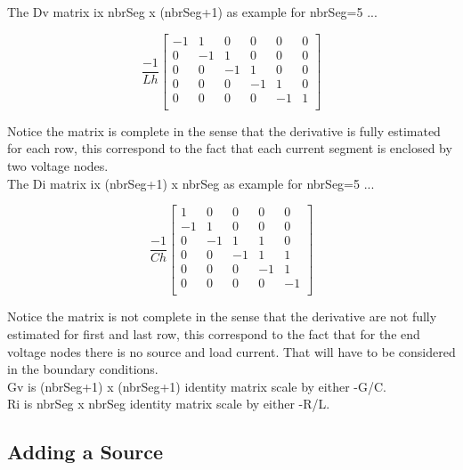 \documentclass[12pt, letterpaper]{article}
\begin{document}
The Dv matrix ix nbrSeg x (nbrSeg+1) as example for nbrSeg=5 ...

\begin{equation}
	\frac{-1}{L h}
	\begin{bmatrix}
	   -1 &  1 & 0 & 0 & 0 &0 \\
	    0 & -1 & 1 & 0 & 0 &0 \\
	    0 &  0 & -1 & 1 & 0 &0 \\
	    0 &  0 & 0 & -1 & 1 & 0 \\
	    0 &  0 & 0& 0 & -1 & 1  \\
	   
	\end{bmatrix}
\end{equation}

Notice the matrix is complete in the sense that the derivative is fully estimated for each row, this correspond to the fact that each current segment is enclosed by two voltage nodes.\\

The Di matrix ix (nbrSeg+1) x nbrSeg as example for nbrSeg=5 ...

\begin{equation}
	\frac{-1}{C h}
	\begin{bmatrix}
		 1 &  0 &  0 &  0 &  0  \\
		-1 &  1 &  0 &  0 &  0  \\
		 0 & -1 &  1 &  1 &  0  \\
		 0 &  0 & -1 &  1 &  1  \\
		 0 &  0 &  0 & -1 &  1  \\
		 0 &  0 &  0 &  0 & -1   \\
	\end{bmatrix}
\end{equation}

Notice the matrix is not complete in the sense that the derivative are not fully estimated for first and last row, this correspond to the fact that for the end voltage nodes there is no source and load current. That will have to be considered in the boundary conditions.\\

Gv is (nbrSeg+1) x (nbrSeg+1) identity matrix scale by either -G/C.\\

Ri is nbrSeg x nbrSeg identity matrix scale by either -R/L.\\

\subsection{Adding a Source}
\end{document}
